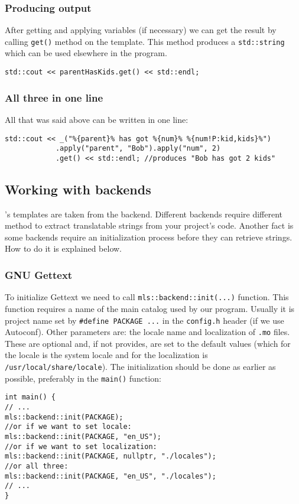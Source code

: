 \subsubsection{Producing output}
After getting and applying variables (if necessary) we can get the result by calling \verb+get()+ method on the template.
This method produces a \verb+std::string+ which can be used elsewhere in the program.
\begin{verbatim}
std::cout << parentHasKids.get() << std::endl;
\end{verbatim}

\subsubsection{All three in one line}
All that was said above can be written in one line:
\begin{verbatim}
std::cout << _("%{parent}% has got %{num}% %{num!P:kid,kids}%")
			.apply("parent", "Bob").apply("num", 2)
			.get() << std::endl; //produces "Bob has got 2 kids"
\end{verbatim}

\subsection{Working with backends}
\mulan{}'s templates are taken from the backend. Different backends require different method to extract translatable strings from your project's code.
Another fact is some backends require an initialization process before they can retrieve strings. How to do it is explained below.
\subsubsection{GNU Gettext}
To initialize Gettext we need to call \verb+mls::backend::init(...)+ function. 
This function requires a name of the main catalog used by our program. Usually it is project name set by \verb+#define PACKAGE ...+ in the \texttt{config.h} header (if we use Autoconf).
Other parameters are: the locale name and localization of \texttt{.mo} files. These are optional and, if not provides, are set to the default values (which for the locale is the system locale 
and for the localization is \texttt{/usr/local/share/locale}). The initialization should be done as earlier as possible, preferably in the \verb+main()+ function:
\begin{verbatim}
int main() {
// ...
mls::backend::init(PACKAGE);
//or if we want to set locale:
mls::backend::init(PACKAGE, "en_US");
//or if we want to set localization:
mls::backend::init(PACKAGE, nullptr, "./locales");
//or all three:
mls::backend::init(PACKAGE, "en_US", "./locales");
// ...
}
\end{verbatim}

